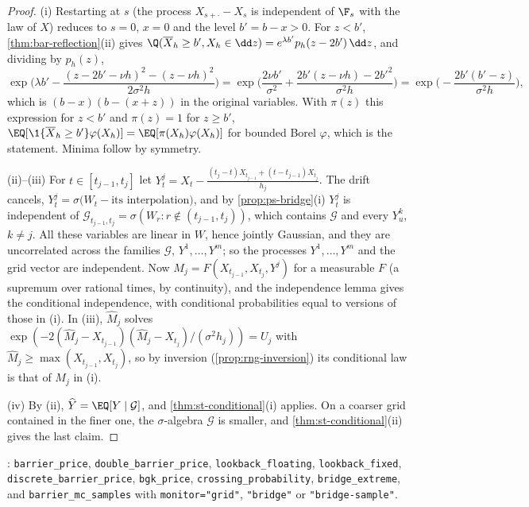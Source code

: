 \begin{proof}
(i) Restarting at $s$ (the process $X_{s+\cdot}-X_s$ is independent of $\F_s$ with the law of $X$)
reduces to $s=0$, $x=0$ and the level $b'=b-x>0$. For $z<b'$, \cref{thm:bar-reflection}(ii) gives
$\Q(\overline X_h\ge b',X_h\in\dd z)=e^{\lambda b'}p_h(z-2b')\,\dd z$, and dividing by $p_h(z)$,
\[
  \exp\Big(\lambda b'-\frac{(z-2b'-\nu h)^2-(z-\nu h)^2}{2\sigma^2h}\Big)
  =\exp\Big(\frac{2\nu b'}{\sigma^2}+\frac{2b'(z-\nu h)-2b'^2}{\sigma^2h}\Big)=\exp\Big(-\frac{2b'(b'-z)}{\sigma^2h}\Big),
\]
which is $(b-x)(b-(x+z))$ in the original variables. With $\pi(z)$ this expression for $z<b'$ and
$\pi(z)=1$ for $z\ge b'$, $\EQ[\1\{\overline X_h\ge b'\}\varphi(X_h)]=\EQ[\pi(X_h)\varphi(X_h)]$ for bounded Borel
$\varphi$, which is the statement. Minima follow by symmetry.

(ii)--(iii) For $t\in[t_{j-1},t_j]$ let $Y^j_t=X_t-\frac{(t_j-t)X_{t_{j-1}}+(t-t_{j-1})X_{t_j}}{h_j}$. The
drift cancels, $Y^j_t=\sigma\big(W_t-\text{its interpolation}\big)$, and by \cref{prop:ps-bridge}(i)
$Y^j_t$ is independent of $\mathcal G_{t_{j-1},t_j}=\sigma(W_r:r\notin(t_{j-1},t_j))$, which contains
$\mathcal G$ and every $Y^k_u$, $k\ne j$. All these variables are linear in $W$, hence jointly
Gaussian, and they are uncorrelated across the families $\mathcal G$, $Y^1,\dots,Y^m$; so the
processes $Y^1,\dots,Y^m$ and the grid vector are independent. Now $M_j=F(X_{t_{j-1}},X_{t_j},Y^j)$
for a measurable $F$ (a supremum over rational times, by continuity), and the independence lemma
gives the conditional independence, with conditional probabilities equal to versions of those
in (i). In (iii), $\widehat M_j$ solves $\exp(-2(\widehat M_j-X_{t_{j-1}})(\widehat M_j-X_{t_j})/(\sigma^2h_j))=U_j$ with
$\widehat M_j\ge\max(X_{t_{j-1}},X_{t_j})$, so by inversion (\cref{prop:rng-inversion}) its conditional law
is that of $M_j$ in (i).

(iv) By (ii), $\widehat Y=\EQ[Y\mid\mathcal G]$, and \cref{thm:st-conditional}(i) applies. On a coarser
grid contained in the finer one, the $\sigma$-algebra $\mathcal G$ is smaller, and
\cref{thm:st-conditional}(ii) gives the last claim.
\end{proof}

\begin{incode}
: \texttt{barrier\_price}, \texttt{double\_barrier\_price},
\texttt{lookback\_floating}, \texttt{lookback\_fixed}, \texttt{discrete\_barrier\_price},
\texttt{bgk\_price}, \texttt{crossing\_probability}, \texttt{bridge\_extreme}, and
\texttt{barrier\_mc\_samples} with \texttt{monitor="grid"}, \texttt{"bridge"} or \texttt{"bridge-sample"}.
\end{incode}

